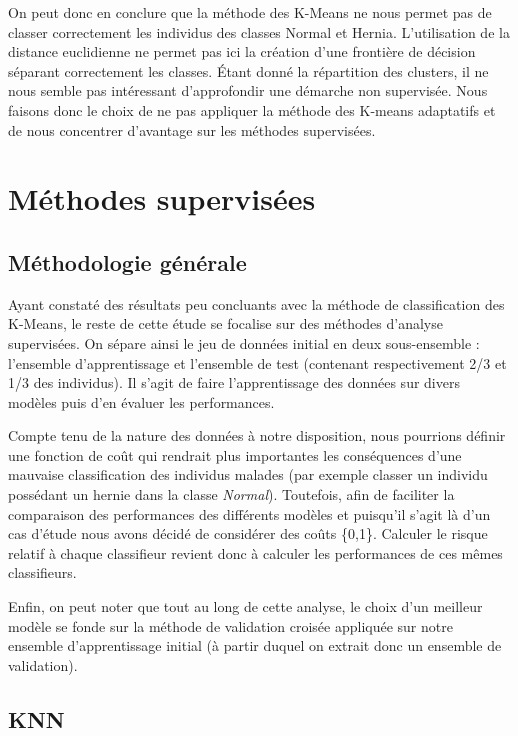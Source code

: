 \documentclass[twocolumn,10pt]{article}
\begin{document}
On peut donc en conclure que la méthode des K-Means ne nous permet pas de classer correctement les individus des classes Normal et Hernia. L'utilisation de la distance euclidienne ne permet pas ici la création d'une frontière de décision séparant correctement les classes. Étant donné la répartition des clusters, il ne nous semble pas intéressant d'approfondir une démarche non supervisée. Nous faisons donc le choix de ne pas appliquer la méthode des K-means adaptatifs et de nous concentrer d'avantage sur les méthodes supervisées.

\section{Méthodes supervisées}

\subsection{Méthodologie générale}

Ayant constaté des résultats peu concluants avec la méthode de classification des K-Means, le reste de cette étude se focalise sur des méthodes d'analyse supervisées. On sépare ainsi le jeu de données initial en deux sous-ensemble : l'ensemble d'apprentissage et l'ensemble de test (contenant respectivement 2/3 et 1/3 des individus). Il s'agit de faire l'apprentissage des données sur divers modèles puis d'en évaluer les performances.

Compte tenu de la nature des données à notre disposition, nous pourrions définir une fonction de coût qui rendrait plus importantes les conséquences d'une mauvaise classification des individus malades (par exemple classer un individu possédant un hernie dans la classe \textit{Normal}). Toutefois, afin de faciliter la comparaison des performances des différents modèles et puisqu'il s'agit là d'un cas d'étude nous avons décidé de considérer des coûts \{0,1\}. Calculer le risque relatif à chaque classifieur revient donc à calculer les performances de ces mêmes classifieurs.

Enfin, on peut noter que tout au long de cette analyse, le choix d'un meilleur modèle se fonde sur la méthode de validation croisée appliquée sur notre ensemble d'apprentissage initial (à partir duquel on extrait donc un ensemble de validation).


\subsection{KNN}
\end{document}

